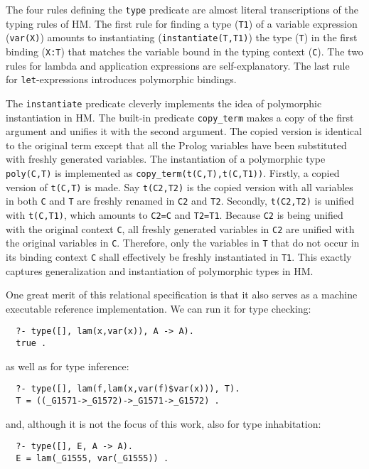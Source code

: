 \documentclass[runningheads,a4paper]{llncs}
\begin{document}
The four rules defining the {\small\verb|type|} predicate are almost literal
transcriptions of the typing rules of HM. The first rule for finding
a type ({\small\verb|T1|}) of a variable expression ({\small\verb|var(X)|})
amounts to instantiating ({\small\verb|instantiate(T,T1)|}) the type
({\small\verb|T|}) in the first binding ({\small\verb|X:T|}) that matches
the variable bound in the typing context ({\small\verb|C|}).
The two rules for lambda and application expressions are self-explanatory.
The last rule for \texttt{let}-expressions introduces polymorphic bindings.

The {\small\verb|instantiate|} predicate
cleverly implements the idea of polymorphic instantiation in HM.
The built-in predicate {\small\verb|copy_term|} makes a copy of
the first argument and unifies it with the second argument. The copied version
is identical to the original term except that all the Prolog variables have been
substituted with freshly generated variables. The instantiation of a polymorphic
type {\small\verb|poly(C,T)|} is implemented as
{\small\verb|copy_term(t(C,T),t(C,T1))|}.
Firstly, a copied version of {\small\verb|t(C,T)|} is made.
Say {\small\verb|t(C2,T2)|} is the copied version with all variables
in both {\small\verb|C|} and {\small\verb|T|}
are freshly renamed in {\small\verb|C2|} and {\small\verb|T2|}.
Secondly, {\small\verb|t(C2,T2)|}
is unified with {\small\verb|t(C,T1)|}, which amounts to {\small\verb|C2=C|}
and {\small\verb|T2=T1|}. Because {\small\verb|C2|} is being unified with
the original context {\small\verb|C|}, all freshly generated variables in
{\small\verb|C2|} are unified with the original variables in \verb|C|.
Therefore, only the variables in {\small\verb|T|} that do not occur in its
binding context {\small\verb|C|} shall effectively be freshly instantiated in 
{\small\verb|T1|}. This exactly captures generalization and instantiation of
polymorphic types in HM.

One great merit of this relational specification is that it also serves as
a machine executable reference implementation. We can run it
for type checking: {\small \vspace*{-1ex}
\begin{verbatim}
  ?- type([], lam(x,var(x)), A -> A).         
  true .
\end{verbatim} \vspace*{-.7ex} }\noindent
as well as for type inference: {\small \vspace*{-1ex}
\begin{verbatim}
  ?- type([], lam(f,lam(x,var(f)$var(x))), T).
  T = ((_G1571->_G1572)->_G1571->_G1572) .
\end{verbatim} \vspace*{-.7ex} }\noindent
and, although it is not the focus of this work,
also for type inhabitation: {\small \vspace*{-1ex}
\begin{verbatim}
  ?- type([], E, A -> A).
  E = lam(_G1555, var(_G1555)) .
\end{verbatim} \vspace*{-.7ex} }
\end{document}
